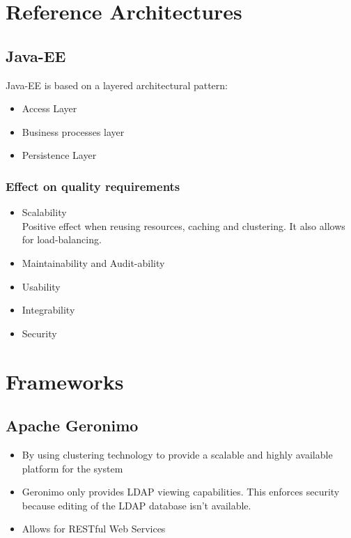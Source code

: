 
\section{Reference Architectures}
	\subsection{Java-EE}
	Java-EE is based on a layered architectural pattern: 
	\begin{itemize}
		\item Access Layer
		\item Business processes layer
		\item Persistence Layer
	\end{itemize}
	\subsubsection{Effect on quality requirements}
	\begin{itemize}
		\item Scalability\\
		Positive effect when reusing resources, caching and clustering. It also allows for load-balancing.
		\item Maintainability and Audit-ability
		
		\item Usability
		\item Integrability  
		\item Security
	\end{itemize}

\section{Frameworks}
	\subsection{Apache Geronimo}
	\begin{itemize}
		\item By using clustering technology to provide a scalable and highly available platform for the system
		\item Geronimo only provides LDAP viewing capabilities. This enforces security because editing of the LDAP database isn't available.
		\item Allows for RESTful Web Services
	\end{itemize}